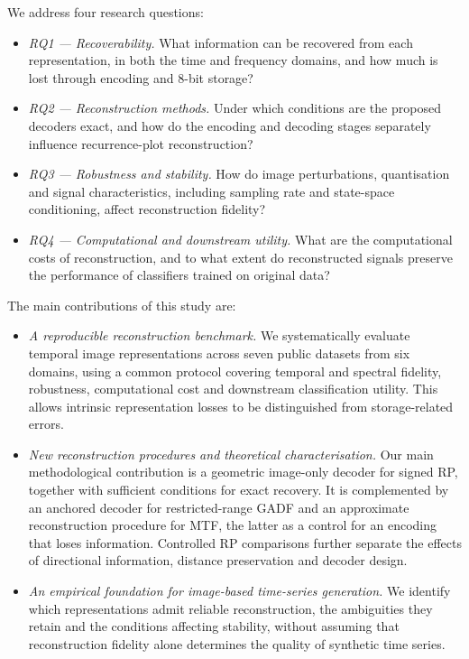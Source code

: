 \documentclass[preprint,review,12pt]{elsarticle}
\begin{document}
We address four research questions:
\begin{itemize}
\item \emph{RQ1 --- Recoverability.} What information can be recovered from each representation, in both the time and frequency domains, and how much is lost through encoding and 8-bit storage?
\item \emph{RQ2 --- Reconstruction methods.} Under which conditions are the proposed decoders exact, and how do the encoding and decoding stages separately influence recurrence-plot reconstruction?
\item \emph{RQ3 --- Robustness and stability.} How do image perturbations, quantisation and signal characteristics, including sampling rate and state-space conditioning, affect reconstruction fidelity?
\item \emph{RQ4 --- Computational and downstream utility.} What are the computational costs of reconstruction, and to what extent do reconstructed signals preserve the performance of classifiers trained on original data?
\end{itemize}

The main contributions of this study are:
\begin{itemize}
\item \emph{A reproducible reconstruction benchmark.} We systematically evaluate temporal image representations across seven public datasets from six domains, using a common protocol covering temporal and spectral fidelity, robustness, computational cost and downstream classification utility. This allows intrinsic representation losses to be distinguished from storage-related errors.
\item \emph{New reconstruction procedures and theoretical characterisation.} Our main methodological contribution is a geometric image-only decoder for signed RP, together with sufficient conditions for exact recovery. It is complemented by an anchored decoder for restricted-range GADF and an approximate reconstruction procedure for MTF, the latter as a control for an encoding that loses information. Controlled RP comparisons further separate the effects of directional information, distance preservation and decoder design.
\item \emph{An empirical foundation for image-based time-series generation.} We identify which representations admit reliable reconstruction, the ambiguities they retain and the conditions affecting stability, without assuming that reconstruction fidelity alone determines the quality of synthetic time series.
\end{itemize}
\end{document}
